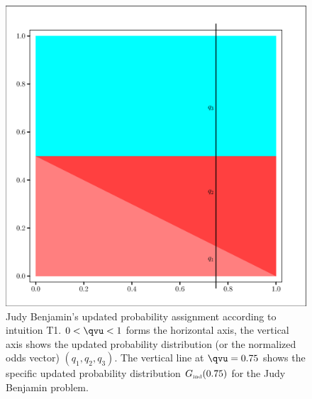 \documentclass[phd,12pt,oneside]{ubcthesis}
\begin{document}
\begin{figure}[ht!]
    \begin{minipage}[h]{.7\linewidth}
      \includegraphics[width=\textwidth]{zeroone-unif.eps}
      \caption{\footnotesize Judy Benjamin's updated probability
        assignment according to intuition T1. $0<{\qvu}<1$ forms the
        horizontal axis, the vertical axis shows the updated
        probability distribution (or the normalized odds vector)
        $(q_{1},q_{2},q_{3})$. The vertical line at ${\qvu}=0.75$
        shows the specific updated probability distribution
        $G_{\mbox{\tiny ind}}(0.75)$ for the Judy Benjamin problem.}
      \label{fig:unif}
    \end{minipage}
\end{figure}
\end{document}
